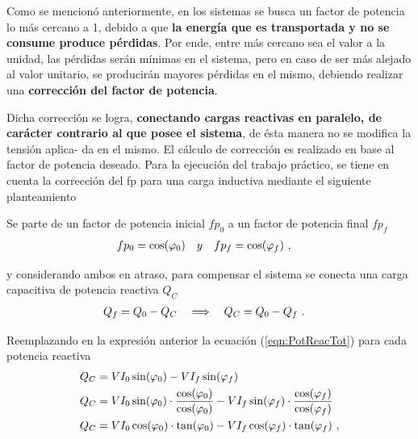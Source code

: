                Como se mencionó anteriormente, en los sistemas se busca un factor de potencia
               lo más cercano a 1, debido a que \textbf{la energía que es transportada 
               y no se consume produce pérdidas}. Por ende, entre más cercano sea el valor a la unidad, las pérdidas
               serán mínimas en el sistema, pero en caso de ser más alejado al valor unitario, se
               producirán mayores pérdidas en el mismo, debiendo realizar una 
               \textbf{corrección del factor de potencia}.

               Dicha corrección se logra, \textbf{conectando cargas reactivas en paralelo, 
               de carácter contrario al que posee el sistema}, de ésta manera no se modifica la tensión aplica-
               da en el mismo. El cálculo de corrección es realizado en base al factor de potencia
               deseado. Para la ejecución del trabajo práctico, se tiene en cuenta la corrección del fp
               para una carga inductiva mediante el siguiente planteamiento

               Se parte de un factor de potencia inicial \(fp_0\) a un factor 
               de potencia final \(fp_f\)
               \begin{align}
                  fp_0  &= \cos(\varphi_0) \hspace{10pt} y \hspace{10pt} fp_f = \cos(\varphi_f)~,  \notag
               \end{align}

               \noindent y considerando ambos en atraso, para compensar el sistema se 
               conecta una carga capacitiva de potencia reactiva \(Q_C\)
               \begin{align}  
                  Q_f   &= Q_0 - Q_C \hspace{10pt}\Longrightarrow\hspace{10pt} Q_C = Q_0 - Q_f ~. \notag
               \end{align}

               \noindent Reemplazando en la expresión anterior la ecuación (\ref{eqn:PotReacTot}) para 
               cada potencia reactiva
               \begin{align}   
                  Q_C   &= V I_0 \sin(\varphi_0) - V I_f \sin(\varphi_f)  \notag \\ 
                  Q_C   &= V I_0 \sin(\varphi_0)\cdot\dfrac{\cos(\varphi_0)}{\cos(\varphi_0)}
                         - V I_f \sin(\varphi_f)\cdot\dfrac{\cos(\varphi_f)}{\cos(\varphi_f)}  \notag \\ 
                  Q_C   &= V I_0 \cos(\varphi_0)\cdot \tan(\varphi_0)  - V I_f \cos(\varphi_f)\cdot \tan(\varphi_f) \ , \notag
               \end{align}   

